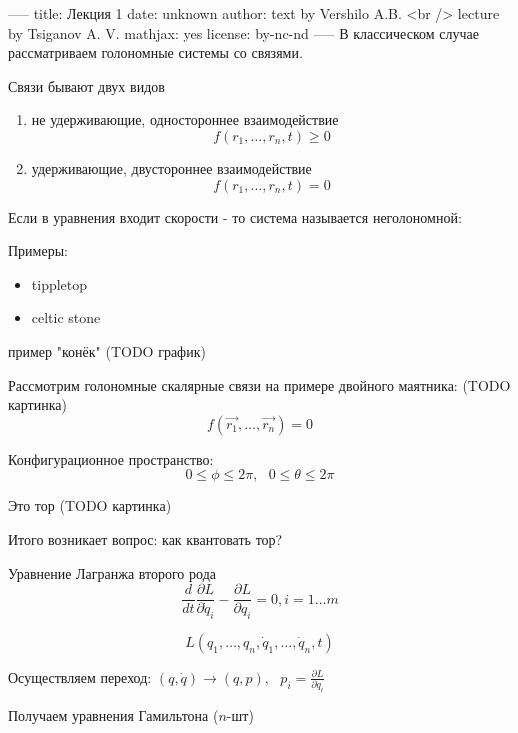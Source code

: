 -----
title: Лекция 1
date: unknown
author: text by Vershilo A.B. <br /> lecture by Tsiganov A. V.
mathjax: yes
license: by-nc-nd
-----
В классическом случае рассматриваем голономные системы со связями.

Связи бывают двух видов

\begin{enumerate}
  \item не удерживающие, одностороннее взаимодействие
    $$ f(r_1,\ldots,r_n,t)\geq 0 $$
  \item удерживающие, двустороннее взаимодействие
    $$ f(r_1,\ldots,r_n,t)=0$$
\end{enumerate}

\begin{definition}
Если в уравнения входит скорости - то система называется неголономной:
\end{definition}

Примеры:
\begin{itemize}
  \item tippletop
  \item celtic stone
\end{itemize}

пример "конёк" (TODO график)

Рассмотрим голономные скалярные связи на примере двойного маятника:
(TODO картинка)
\begin{equation}
  f(\vec{r_1},\ldots,\vec{r_n}) = 0
\end{equation}

Конфигурационное пространство:
\begin{equation}
  0 \leq \phi \leq 2\pi,~~~ 0 \leq \theta \leq 2\pi
\end{equation}

Это тор (TODO картинка)

Итого возникает вопрос: как квантовать тор?

Уравнение Лагранжа второго рода
\begin{equation}
\dfrac{d}{dt} \frac{\partial L}{\partial \dot{q}_i} - \frac{\partial L}{\partial q_i} = 0, i=1\ldots m
\end{equation}

\begin{equation}
L(q_1,\ldots,q_n,\dot{q}_1,\ldots,\dot{q}_n,t)
\end{equation}

Осуществляем переход: $(q,\dot{q}) \rightarrow (q,p), ~~~ p_i = \frac{\partial L}{\partial \dot{q}_i}$

Получаем уравнения Гамильтона ($n$-шт)

